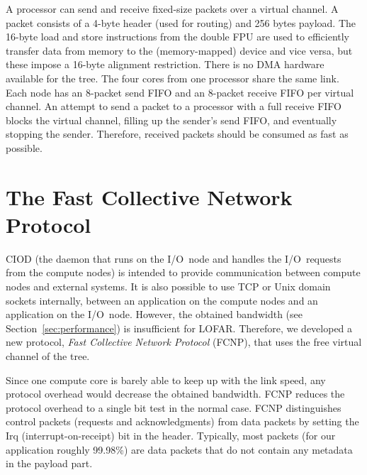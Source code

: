 \documentclass[journal]{IEEEtran}
\begin{document}
A processor can send and receive fixed-size packets over a virtual channel.
A packet consists of a 4-byte header (used for routing) and 256 bytes payload.
The 16-byte load and store instructions from the double FPU are used to
efficiently transfer data from memory to the (memory-mapped) device and vice
versa, but these impose a 16-byte alignment restriction.
There is no DMA hardware available for the tree.
The four cores from one processor share the same link.
Each node has an 8-packet send FIFO and an 8-packet receive FIFO per virtual
channel.
An attempt to send a packet to a processor with a full receive FIFO blocks
the virtual channel, filling up the sender's send FIFO, and eventually stopping
the sender.
Therefore, received packets should be consumed as fast as possible.



\section{The Fast Collective Network Protocol}
\label{sec:FCNP}

CIOD (the daemon that runs on the I/O~node and handles the I/O~requests from
the compute nodes) is intended to provide communication between compute nodes
and external systems.
It is also possible to use TCP or Unix domain sockets internally,
between an application on the compute nodes and an application on the I/O~node.
However, the obtained bandwidth (see Section~\ref{sec:performance}) is
insufficient for LOFAR.
Therefore, we developed a new protocol, \emph{Fast Collective Network
Protocol\/} (FCNP), that uses the free virtual channel of the tree.

Since one compute core is barely able to keep up with the link speed,
any protocol overhead would decrease the obtained bandwidth.
FCNP reduces the protocol overhead to a single bit test in the normal case.
FCNP distinguishes control packets (requests and acknowledgments) from data
packets by setting the Irq (interrupt-on-receipt) bit in the header.
Typically, most packets (for our application roughly 99.98\%) are data packets
that do not contain any metadata in the payload part.
\end{document}
